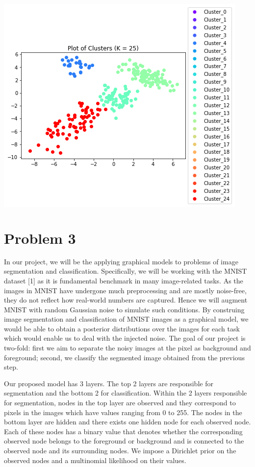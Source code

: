 \documentclass[twoside]{homework}
\begin{document}
\begin{centering}
\includegraphics[scale=0.75]{VI_Plot_4}\\
\end{centering}
\newpage
\section*{Problem 3}
In our project, we will be the applying graphical models to problems of image segmentation and classification. Specifically, we will be working with the MNIST dataset [1] as it is fundamental benchmark in many image-related tasks. As the images in MNIST have undergone much preprocessing and are mostly noise-free, they do not reflect how real-world numbers are captured. Hence we will augment MNIST with random Gaussian noise to simulate such conditions. By construing image segmentation and classification of MNIST images as a graphical model, we would be able to obtain a posterior distributions over the images for each task which would enable us to deal with the injected noise. The goal of our project is two-fold: first we aim to separate the noisy images at the pixel as background and foreground; second, we classify the segmented image obtained from the previous step.

Our proposed model has 3 layers. The top 2 layers are responsible for segmentation and the bottom 2 for classification. Within the 2 layers responsible for segmentation, nodes in the top layer are observed and they correspond to pixels in the images which have values ranging from 0 to 255. The nodes in the bottom layer are hidden and there exists one hidden node for each observed node. Each of these nodes has a binary value that denotes whether the corresponding observed node belongs to the foreground or background and is connected to the observed node and its surrounding nodes. We impose a Dirichlet prior on the observed nodes and a multinomial likelihood on their values.
\end{document}
